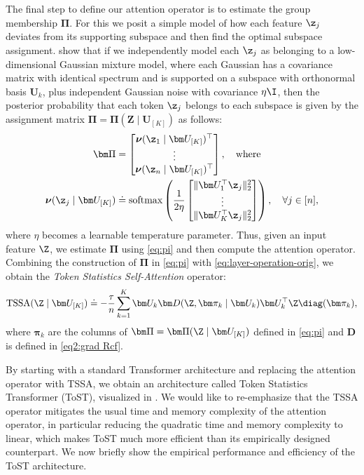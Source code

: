 \documentclass[../../book-main.tex]{subfiles}
\begin{document}
The final step to define our attention operator is to estimate the
group membership $\bm\Pi$. For this we posit a simple model of how
each feature \(\z_{j}\) deviates from its supporting subspace and
then find the optimal subspace assignment. \cite{yu2023white} show
that if we independently model each \(\z_{j}\) as belonging to a
low-dimensional Gaussian mixture model, where each Gaussian has a
covariance matrix with identical spectrum and is supported on a
subspace with orthonormal basis \(\bm U_{k}\), plus independent
Gaussian noise with covariance \(\eta \I\), then the posterior
probability that each token \(\z_{j}\) belongs to each subspace is
given by the assignment matrix \(\bm \Pi = \bm \Pi(\bm Z \mid \bm
U_{[K]})\) as follows:
\begin{align}\label{eq:pi}
    \bm \Pi & =
    \begin{bmatrix} \boldsymbol{\nu}(\z_1 \mid \bm U_{[K]})^\top
        \\ \vdots \\ \boldsymbol{\nu}(\z_n \mid \bm U_{[K]})^\top
    \end{bmatrix}, \quad
    \text{where} \\
    \boldsymbol{\nu}(\z_j \mid \bm U_{[K]}) &\doteq
    \operatorname{softmax}\left( \frac{1}{2\eta}
        \begin{bmatrix} \|  \bm U_{1}^{\top} \z_j \|_2^2 \\ \vdots
            \\ \| \bm U_{K}^{\top} \z_j \|_2^2
    \end{bmatrix} \right), \quad \forall j \in [n],
\end{align}
where $\eta$ becomes a learnable temperature parameter. Thus, given
an input feature \(\Z\), we estimate \(\bm\Pi\) using \eqref{eq:pi}
and then compute the attention operator.  Combining the construction
of $\bm\Pi$ in \eqref{eq:pi} with
\eqref{eq:layer-operation-orig}, we obtain the {\em Token Statistics
Self-Attention} operator:
\begin{equation}
    \label{eq:tssa}
    \operatorname{TSSA}(\Z \mid \bm U_{[K]}) \doteq -\frac{\tau}{n}\sum_{k
    = 1}^{K}\bm U_{k}\bm D(\Z, \bm\pi_{k} \mid \bm U_{k})\bm
    U_{k}^{\top}\Z\diag(\bm \pi_{k}),
\end{equation}
where \(\bm\pi_{k}\) are the columns of \(\bm\Pi = \bm\Pi(\Z \mid \bm
U_{[K]})\) defined in \eqref{eq:pi} and \(\bm D\) is defined in
\eqref{eq2:grad Rcf}.

By starting with a standard Transformer architecture and replacing
the attention operator with TSSA, we obtain an architecture called
Token Statistics Transformer (ToST), visualized in
. We would like to re-emphasize that
the TSSA operator mitigates the usual time and memory complexity of
the attention operator, in particular reducing the quadratic time and
memory complexity to linear, which makes ToST much more efficient
than its empirically designed counterpart. We now briefly show the
empirical performance and efficiency of the ToST architecture.
\end{document}
